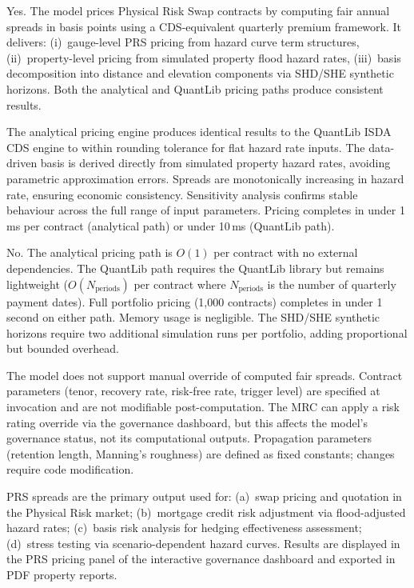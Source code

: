 \documentclass[11pt,a4paper]{article}
\begin{document}
Yes. The model prices Physical Risk Swap contracts by computing fair annual spreads in basis points using a CDS-equivalent quarterly premium framework. It delivers: (i)~gauge-level PRS pricing from hazard curve term structures, (ii)~property-level pricing from simulated property flood hazard rates, (iii)~basis decomposition into distance and elevation components via SHD/SHE synthetic horizons. Both the analytical and QuantLib pricing paths produce consistent results.

The analytical pricing engine produces identical results to the QuantLib ISDA CDS engine to within rounding tolerance for flat hazard rate inputs. The data-driven basis is derived directly from simulated property hazard rates, avoiding parametric approximation errors. Spreads are monotonically increasing in hazard rate, ensuring economic consistency. Sensitivity analysis confirms stable behaviour across the full range of input parameters. Pricing completes in under 1\,ms per contract (analytical path) or under 10\,ms (QuantLib path).

No. The analytical pricing path is $O(1)$ per contract with no external dependencies. The QuantLib path requires the QuantLib library but remains lightweight ($O(N_{\text{periods}})$ per contract where $N_{\text{periods}}$ is the number of quarterly payment dates). Full portfolio pricing (1,000 contracts) completes in under 1 second on either path. Memory usage is negligible. The SHD/SHE synthetic horizons require two additional simulation runs per portfolio, adding proportional but bounded overhead.

The model does not support manual override of computed fair spreads. Contract parameters (tenor, recovery rate, risk-free rate, trigger level) are specified at invocation and are not modifiable post-computation. The MRC can apply a risk rating override via the governance dashboard, but this affects the model's governance status, not its computational outputs. Propagation parameters (retention length, Manning's roughness) are defined as fixed constants; changes require code modification.

PRS spreads are the primary output used for: (a)~swap pricing and quotation in the Physical Risk market; (b)~mortgage credit risk adjustment via flood-adjusted hazard rates; (c)~basis risk analysis for hedging effectiveness assessment; (d)~stress testing via scenario-dependent hazard curves. Results are displayed in the PRS pricing panel of the interactive governance dashboard and exported in PDF property reports.
\end{document}
